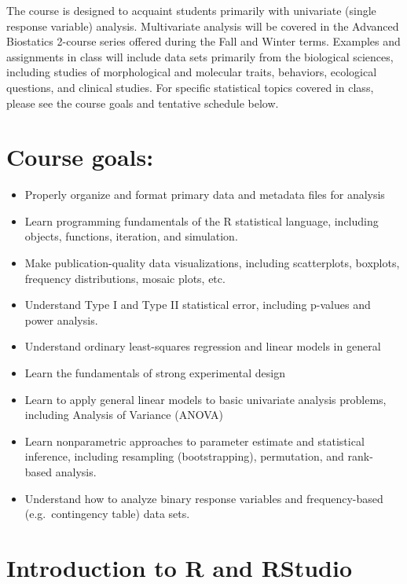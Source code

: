 \documentclass[]{book}
\providecommand{\tightlist}{%
  \setlength{\itemsep}{0pt}\setlength{\parskip}{0pt}}
\begin{document}
The course is designed to acquaint students primarily with univariate (single
response variable) analysis. Multivariate analysis will be covered in the Advanced
Biostatics 2-course series offered during the Fall and Winter terms. Examples and
assignments in class will include data sets primarily from the biological sciences,
including studies of morphological and molecular traits, behaviors, ecological
questions, and clinical studies. For specific statistical topics covered in class, please
see the course goals and tentative schedule below.

\hypertarget{course-goals}{%
\section{Course goals:}\label{course-goals}}

\begin{itemize}
\tightlist
\item
  Properly organize and format primary data and metadata files for analysis
\item
  Learn programming fundamentals of the R statistical language, including
  objects, functions, iteration, and simulation.
\item
  Make publication-quality data visualizations, including scatterplots, boxplots,
  frequency distributions, mosaic plots, etc.
\item
  Understand Type I and Type II statistical error, including p-values and power analysis.
\item
  Understand ordinary least-squares regression and linear models in general
\item
  Learn the fundamentals of strong experimental design
\item
  Learn to apply general linear models to basic univariate analysis problems,
  including Analysis of Variance (ANOVA)
\item
  Learn nonparametric approaches to parameter estimate and statistical
  inference, including resampling (bootstrapping), permutation, and rank-
  based analysis.
\item
  Understand how to analyze binary response variables and frequency-based
  (e.g.~contingency table) data sets.
\end{itemize}

\hypertarget{introduction-to-r-and-rstudio}{%
\section{Introduction to R and RStudio}\label{introduction-to-r-and-rstudio}}
\end{document}
